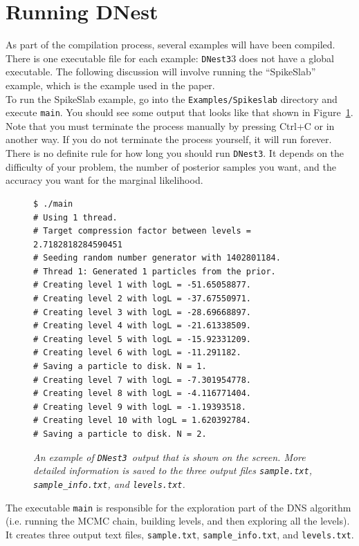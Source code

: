 \documentclass[a4paper, 11pt]{article}
\newcommand{\dnest}{{\tt DNest3}}
\begin{document}
\section{Running DNest}
As part of the compilation process, several examples will have been compiled.
There is one executable file for each example: \dnest3 does not have a global
executable. The
following discussion will involve running the ``SpikeSlab'' example, which is
the example used in the paper.\\

To run the SpikeSlab example, go into the {\tt Examples/Spikeslab}
directory and execute {\tt main}. You should see some output that looks like
that shown in Figure~\ref{fig:output}.
Note that you must terminate the process manually by pressing Ctrl+C
or in another way. If you do not terminate the process yourself, it will run
forever. There is no definite rule for how long you should run \dnest.
It depends on the difficulty of your problem, the number of posterior samples you
want, and the accuracy you want for the marginal likelihood.\\

\begin{figure}[h!]
\begin{framed}
\begin{verbatim}
$ ./main
# Using 1 thread.
# Target compression factor between levels = 2.7182818284590451
# Seeding random number generator with 1402801184.
# Thread 1: Generated 1 particles from the prior.
# Creating level 1 with logL = -51.65058877.
# Creating level 2 with logL = -37.67550971.
# Creating level 3 with logL = -28.69668897.
# Creating level 4 with logL = -21.61338509.
# Creating level 5 with logL = -15.92331209.
# Creating level 6 with logL = -11.291182.
# Saving a particle to disk. N = 1.
# Creating level 7 with logL = -7.301954778.
# Creating level 8 with logL = -4.116771404.
# Creating level 9 with logL = -1.19393518.
# Creating level 10 with logL = 1.620392784.
# Saving a particle to disk. N = 2.
\end{verbatim}
\end{framed}
\caption{\it An example of \dnest~output that is shown on the screen. More
detailed information is saved to the three output files
{\tt sample.txt}, {\tt sample\_info.txt}, and {\tt levels.txt}.
\label{fig:output}}
\end{figure}

The executable {\tt main} is responsible for the exploration part of the
DNS algorithm (i.e. running the MCMC chain, building
levels, and then exploring all the levels). It creates three output text files,
{\tt sample.txt}, {\tt sample\_info.txt}, and {\tt levels.txt}.\\
\end{document}
